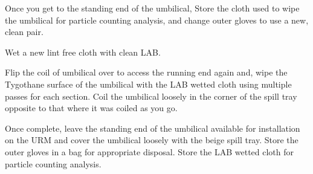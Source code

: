 \documentclass[11pt]{article}
\begin{document}
\begin{answerlist}
\item Once you get to the standing end of the umbilical, Store the
  cloth used to wipe the umbilical for particle counting analysis, and
  change outer gloves to use a new, clean pair.
\item Wet a new lint free cloth with clean LAB.
\item Flip the coil of umbilical over to access the running end again
  and, wipe the Tygothane surface of the umbilical with the LAB wetted
  cloth using multiple passes for each section. Coil the umbilical
  loosely in the corner of the spill tray opposite to that where it
  was coiled as you go.
\item Once complete, leave the standing end of the umbilical available
  for installation on the URM and cover the umbilical loosely with the
  beige spill tray. Store the outer gloves in a bag for appropriate
  disposal. Store the LAB wetted cloth for particle counting analysis.
\end{answerlist}
\end{document}
